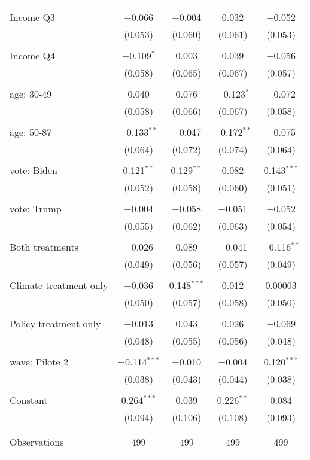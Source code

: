 \begin{tabular}{@{\extracolsep{5pt}}lcccc}
  & & & & \\ 
 Income Q3 & $-$0.066 & $-$0.004 & 0.032 & $-$0.052 \\ 
  & (0.053) & (0.060) & (0.061) & (0.053) \\ 
  & & & & \\ 
 Income Q4 & $-$0.109$^{*}$ & 0.003 & 0.039 & $-$0.056 \\ 
  & (0.058) & (0.065) & (0.067) & (0.057) \\ 
  & & & & \\ 
 age: 30-49 & 0.040 & 0.076 & $-$0.123$^{*}$ & $-$0.072 \\ 
  & (0.058) & (0.066) & (0.067) & (0.058) \\ 
  & & & & \\ 
 age: 50-87 & $-$0.133$^{**}$ & $-$0.047 & $-$0.172$^{**}$ & $-$0.075 \\ 
  & (0.064) & (0.072) & (0.074) & (0.064) \\ 
  & & & & \\ 
 vote: Biden & 0.121$^{**}$ & 0.129$^{**}$ & 0.082 & 0.143$^{***}$ \\ 
  & (0.052) & (0.058) & (0.060) & (0.051) \\ 
  & & & & \\ 
 vote: Trump & $-$0.004 & $-$0.058 & $-$0.051 & $-$0.052 \\ 
  & (0.055) & (0.062) & (0.063) & (0.054) \\ 
  & & & & \\ 
 Both treatments & $-$0.026 & 0.089 & $-$0.041 & $-$0.116$^{**}$ \\ 
  & (0.049) & (0.056) & (0.057) & (0.049) \\ 
  & & & & \\ 
 Climate treatment only & $-$0.036 & 0.148$^{***}$ & 0.012 & 0.00003 \\ 
  & (0.050) & (0.057) & (0.058) & (0.050) \\ 
  & & & & \\ 
 Policy treatment only & $-$0.013 & 0.043 & 0.026 & $-$0.069 \\ 
  & (0.048) & (0.055) & (0.056) & (0.048) \\ 
  & & & & \\ 
 wave: Pilote 2 & $-$0.114$^{***}$ & $-$0.010 & $-$0.004 & 0.120$^{***}$ \\ 
  & (0.038) & (0.043) & (0.044) & (0.038) \\ 
  & & & & \\ 
 Constant & 0.264$^{***}$ & 0.039 & 0.226$^{**}$ & 0.084 \\ 
  & (0.094) & (0.106) & (0.108) & (0.093) \\ 
  & & & & \\ 
\hline \\[-1.8ex] 

Observations & 499 & 499 & 499 & 499 \\ 
\hline 
\hline \\[-1.8ex] 
\end{tabular} 